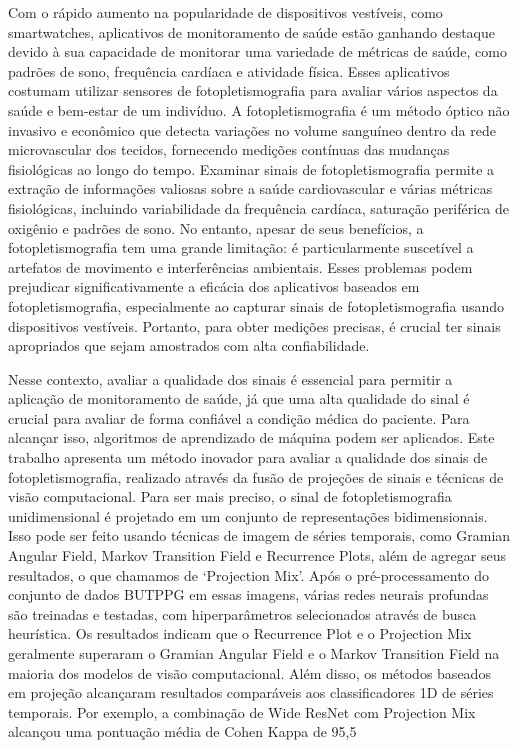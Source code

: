 Com o rápido aumento na popularidade de dispositivos vestíveis, como smartwatches, aplicativos de monitoramento de saúde estão ganhando destaque devido à sua capacidade de monitorar uma variedade de métricas de saúde, como padrões de sono, frequência cardíaca e atividade física. Esses aplicativos costumam utilizar sensores de fotopletismografia para avaliar vários aspectos da saúde e bem-estar de um indivíduo. A fotopletismografia é um método óptico não invasivo e econômico que detecta variações no volume sanguíneo dentro da rede microvascular dos tecidos, fornecendo medições contínuas das mudanças fisiológicas ao longo do tempo. Examinar sinais de fotopletismografia permite a extração de informações valiosas sobre a saúde cardiovascular e várias métricas fisiológicas, incluindo variabilidade da frequência cardíaca, saturação periférica de oxigênio e padrões de sono. No entanto, apesar de seus benefícios, a fotopletismografia tem uma grande limitação: é particularmente suscetível a artefatos de movimento e interferências ambientais. Esses problemas podem prejudicar significativamente a eficácia dos aplicativos baseados em fotopletismografia, especialmente ao capturar sinais de fotopletismografia usando dispositivos vestíveis. Portanto, para obter medições precisas, é crucial ter sinais apropriados que sejam amostrados com alta confiabilidade.

Nesse contexto, avaliar a qualidade dos sinais é essencial para permitir a aplicação de monitoramento de saúde, já que uma alta qualidade do sinal é crucial para avaliar de forma confiável a condição médica do paciente. Para alcançar isso, algoritmos de aprendizado de máquina podem ser aplicados. Este trabalho apresenta um método inovador para avaliar a qualidade dos sinais de fotopletismografia, realizado através da fusão de projeções de sinais e técnicas de visão computacional. Para ser mais preciso, o sinal de fotopletismografia unidimensional é projetado em um conjunto de representações bidimensionais. Isso pode ser feito usando técnicas de imagem de séries temporais, como Gramian Angular Field, Markov Transition Field e Recurrence Plots, além de agregar seus resultados, o que chamamos de `Projection Mix'. Após o pré-processamento do conjunto de dados \gls{BUTPPG} em essas imagens, várias redes neurais profundas são treinadas e testadas, com hiperparâmetros selecionados através de busca heurística. Os resultados indicam que o Recurrence Plot e o Projection Mix geralmente superaram o Gramian Angular Field e o Markov Transition Field na maioria dos modelos de visão computacional. Além disso, os métodos baseados em projeção alcançaram resultados comparáveis aos classificadores 1D de séries temporais. Por exemplo, a combinação de Wide ResNet com Projection Mix alcançou uma pontuação média de Cohen Kappa de 95,5%